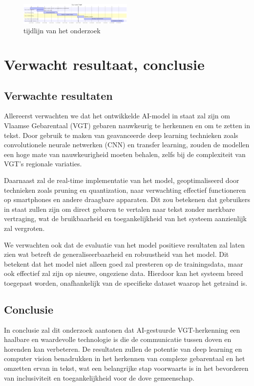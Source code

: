 \begin{figure}[h!]
  \includegraphics[width=0.5\textwidth]{../graphics/gantt_tijd.png}
  \caption{tijdlijn van het onderzoek}
  \label{fig:gantt_tijd}
\end{figure}
\section{Verwacht resultaat, conclusie}%
\label{sec:verwachte_resultaten}
\subsection{Verwachte resultaten} Allereerst verwachten we dat het ontwikkelde AI-model in staat zal zijn om Vlaamse Gebarentaal (VGT) gebaren nauwkeurig te herkennen en om te zetten in tekst. Door gebruik te maken van geavanceerde deep learning technieken zoals convolutionele neurale netwerken (CNN) en transfer learning, zouden de modellen een hoge mate van nauwkeurigheid moeten behalen, zelfs bij de complexiteit van VGT's regionale variaties.

Daarnaast zal de real-time implementatie van het model, geoptimaliseerd door technieken zoals pruning en quantization, naar verwachting effectief functioneren op smartphones en andere draagbare apparaten. Dit zou betekenen dat gebruikers in staat zullen zijn om direct gebaren te vertalen naar tekst zonder merkbare vertraging, wat de bruikbaarheid en toegankelijkheid van het systeem aanzienlijk zal vergroten.

We verwachten ook dat de evaluatie van het model positieve resultaten zal laten zien wat betreft de generaliseerbaarheid en robuustheid van het model. Dit betekent dat het model niet alleen goed zal presteren op de trainingsdata, maar ook effectief zal zijn op nieuwe, ongeziene data. Hierdoor kan het systeem breed toegepast worden, onafhankelijk van de specifieke dataset waarop het getraind is.

\subsection{Conclusie} In conclusie zal dit onderzoek aantonen dat AI-gestuurde VGT-herkenning een haalbare en waardevolle technologie is die de communicatie tussen doven en horenden kan verbeteren. De resultaten zullen de potentie van deep learning en computer vision benadrukken in het herkennen van complexe gebarentaal en het omzetten ervan in tekst, wat een belangrijke stap voorwaarts is in het bevorderen van inclusiviteit en toegankelijkheid voor de dove gemeenschap.

